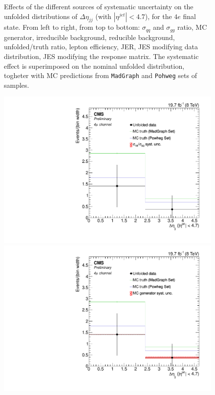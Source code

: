 \begin{figure}[hbtp]
\begin{center}
   \caption{Effects of the different sources of systematic uncertainty on the unfolded distributions of $\Delta\eta_{jj}$ (with $|\eta^{jet}|<4.7$), for the $4e$ final state. From left to right, from top to bottom: $\sigma_{qq}$ and $\sigma_{gg}$ ratio, MC generator, irreducible background, reducible background, unfolded/truth ratio, lepton efficiency, JER, JES modifying data distribution, JES modifying the response matrix. The systematic effect is superimposed on the nominal unfolded distribution, togheter with MC predictions from \texttt{MadGraph} and \texttt{Pohweg} sets of samples.}
   \label{fig:Deta_syst_4e}
 \end{center}
\end{figure}

\begin{figure}[hbtp]
 \begin{center}
   \includegraphics[width=0.8\cmsFigWidth]{Figures/Unfolding/Systematics/ZZTo4m_Deta_qqgg_Mad_fr}     
   \includegraphics[width=0.8\cmsFigWidth]{Figures/Unfolding/Systematics/ZZTo4m_Deta_MCgen_Mad_fr}     

\end{center}
\end{figure}
